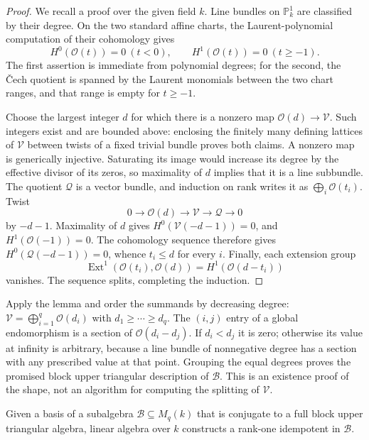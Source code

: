\begin{proof}
We recall a proof over the given field $k$.  Line bundles on
$\mathbb P^1_k$ are classified by their degree.  On the two standard
affine charts, the Laurent-polynomial computation of their
cohomology gives
\[
 H^0(\mathcal O(t))=0\ (t<0),\qquad
 H^1(\mathcal O(t))=0\ (t\ge-1).
\]
The first assertion is immediate from polynomial degrees; for the
second, the \v Cech quotient is spanned by the Laurent monomials
between the two chart ranges, and that range is empty for $t\ge-1$.

Choose the largest integer $d$ for which there is a nonzero map
$\mathcal O(d)\to\mathcal V$.  Such integers exist and are bounded
above: enclosing the finitely many defining lattices of $\mathcal V$
between twists of a fixed trivial bundle proves both claims.  A
nonzero map is generically injective.  Saturating its image would
increase its degree by the effective divisor of its zeros, so
maximality of $d$ implies that it is a line subbundle.  The quotient
$\mathcal Q$ is a vector bundle, and induction on rank writes it as
$\bigoplus_i\mathcal O(t_i)$.  Twist
\[
 0\longrightarrow\mathcal O(d)\longrightarrow\mathcal V
   \longrightarrow\mathcal Q\longrightarrow0
\]
by $-d-1$.  Maximality of $d$ gives
$H^0(\mathcal V(-d-1))=0$, and $H^1(\mathcal O(-1))=0$.
The cohomology sequence therefore gives
$H^0(\mathcal Q(-d-1))=0$, whence $t_i\le d$ for every $i$.
Finally, each extension group
\[
 \operatorname{Ext}^1(\mathcal O(t_i),\mathcal O(d))
   =H^1(\mathcal O(d-t_i))
\]
vanishes.  The sequence splits, completing the induction.
\end{proof}

Apply the lemma and order the summands by decreasing degree:
$\mathcal V=\bigoplus_{i=1}^q\mathcal O(d_i)$ with
$d_1\ge\cdots\ge d_q$.  The $(i,j)$ entry of a global endomorphism
is a section of $\mathcal O(d_i-d_j)$.  If $d_i<d_j$ it is zero;
otherwise its value at infinity is arbitrary, because a line bundle
of nonnegative degree has a section with any prescribed value at that
point.  Grouping the equal degrees proves the promised block upper
triangular description of $\mathcal B$.  This is an existence proof of
the shape, not an algorithm for computing the splitting of
$\mathcal V$.

\begin{lemma}
\label{norm:fiber-idempotent}
Given a basis of a subalgebra $\mathcal B\subseteq M_q(k)$ that is
conjugate to a full block upper triangular algebra, linear algebra
over $k$ constructs a rank-one idempotent in $\mathcal B$.
\end{lemma}

